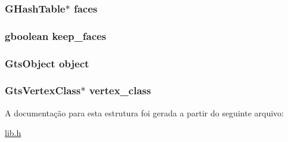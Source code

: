 \subsubsection[{\texorpdfstring{faces}{faces}}]{\setlength{\rightskip}{0pt plus 5cm}G\+Hash\+Table$\ast$ faces}\hypertarget{structdbSurface_a2491590bd6d18542d6fab3090c43f646}{}\label{structdbSurface_a2491590bd6d18542d6fab3090c43f646}
\subsubsection[{\texorpdfstring{keep\+\_\+faces}{keep_faces}}]{\setlength{\rightskip}{0pt plus 5cm}gboolean keep\+\_\+faces}\hypertarget{structdbSurface_a91e9416b378907785e1867c96a71e302}{}\label{structdbSurface_a91e9416b378907785e1867c96a71e302}
\subsubsection[{\texorpdfstring{object}{object}}]{\setlength{\rightskip}{0pt plus 5cm}Gts\+Object object}\hypertarget{structdbSurface_a4c9ad028a3c5d740f1fc0b15669c1c0f}{}\label{structdbSurface_a4c9ad028a3c5d740f1fc0b15669c1c0f}
\subsubsection[{\texorpdfstring{vertex\+\_\+class}{vertex_class}}]{\setlength{\rightskip}{0pt plus 5cm}Gts\+Vertex\+Class$\ast$ vertex\+\_\+class}\hypertarget{structdbSurface_a40aba9c5621bf74c8d649089e1a82529}{}\label{structdbSurface_a40aba9c5621bf74c8d649089e1a82529}


A documentação para esta estrutura foi gerada a partir do seguinte arquivo\+:\begin{DoxyCompactItemize}
\item 
\hyperlink{lib_8h}{lib.\+h}\end{DoxyCompactItemize}
